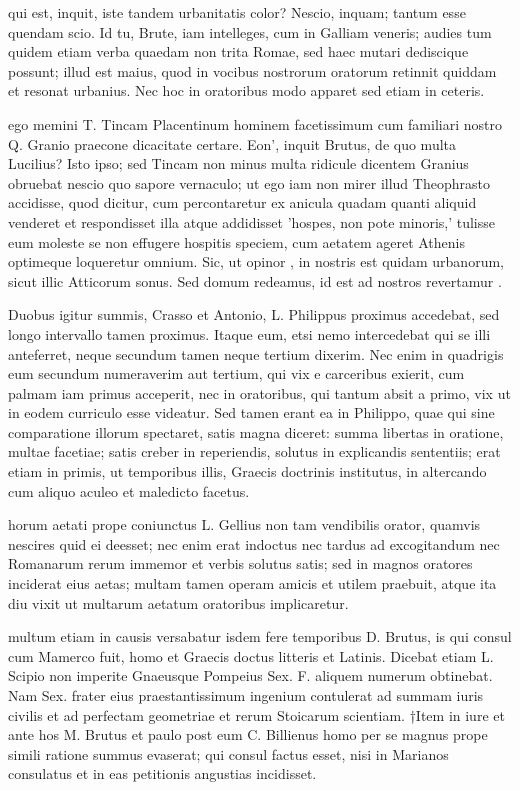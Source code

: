  qui est, inquit, iste tandem urbanitatis color? Nescio, inquam; tantum esse quendam scio. Id tu, Brute, iam intelleges, cum in Galliam veneris; audies tum quidem etiam verba quaedam non trita Romae, sed haec mutari dediscique possunt; illud est maius, quod in vocibus nostrorum oratorum retinnit quiddam et resonat urbanius. Nec hoc in oratoribus modo apparet sed etiam in ceteris.

 ego memini T. Tincam Placentinum hominem facetissimum cum familiari nostro Q. Granio praecone dicacitate certare. Eon', inquit Brutus, de quo multa Lucilius? Isto ipso; sed Tincam non minus multa ridicule dicentem Granius obruebat nescio quo sapore vernaculo; ut ego iam non mirer illud Theophrasto accidisse, quod dicitur, cum percontaretur ex anicula quadam quanti aliquid venderet et respondisset illa atque addidisset 'hospes, non pote minoris,' tulisse eum moleste se non effugere hospitis speciem, cum aetatem ageret Athenis optimeque loqueretur omnium. Sic, ut opinor , in nostris est quidam urbanorum, sicut illic Atticorum sonus. Sed domum redeamus, id est ad nostros revertamur .

 Duobus igitur summis, Crasso et Antonio, L. Philippus proximus accedebat, sed longo intervallo tamen proximus. Itaque eum, etsi nemo intercedebat qui se illi anteferret, neque secundum tamen neque tertium dixerim. Nec enim in quadrigis eum secundum numeraverim aut tertium, qui vix e carceribus exierit, cum palmam iam primus acceperit, nec in oratoribus, qui tantum absit a primo, vix ut in eodem curriculo esse videatur. Sed tamen erant ea in Philippo, quae qui sine comparatione illorum spectaret, satis magna diceret: summa libertas in oratione, multae facetiae; satis creber in reperiendis, solutus in explicandis sententiis; erat etiam in primis, ut temporibus illis, Graecis doctrinis institutus, in altercando cum aliquo aculeo et maledicto facetus.

 horum aetati prope coniunctus L. Gellius non tam vendibilis orator, quamvis nescires quid ei deesset; nec enim erat indoctus nec tardus ad excogitandum nec Romanarum rerum immemor et verbis solutus satis; sed in magnos oratores inciderat eius aetas; multam tamen operam amicis et utilem praebuit, atque ita diu vixit ut multarum aetatum oratoribus implicaretur.

 multum etiam in causis versabatur isdem fere temporibus D. Brutus, is qui consul cum Mamerco fuit, homo et Graecis doctus litteris et Latinis. Dicebat etiam L. Scipio non imperite Gnaeusque Pompeius Sex. F. aliquem numerum obtinebat. Nam Sex. frater eius praestantissimum ingenium contulerat ad summam iuris civilis et ad perfectam geometriae et rerum Stoicarum scientiam. †Item in iure et ante hos M. Brutus et paulo post eum C. Billienus homo per se magnus prope simili ratione summus evaserat; qui consul factus esset, nisi in Marianos consulatus et in eas petitionis angustias incidisset.

